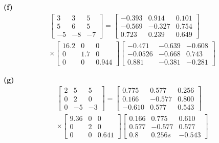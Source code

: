 \begin{resolution}
  \vspace{12pt}
  {\bf (f)}\; \begin{multline*}\begin{bmatrix}
      3 & 3 & 5 \\ 5 & 6 & 5 \\ -5 & -8 & -7
    \end{bmatrix} = \begin{bmatrix}
      -0.393 & 0.914  & 0.101 \\
      -0.569 & -0.327 & 0.754 \\
      0.723  & 0.239  & 0.649
    \end{bmatrix} \\ \times \begin{bmatrix}
      16.2 & 0 & 0 \\ 0 & 1.7 & 0 \\ 0 & 0 & 0.944
    \end{bmatrix}  \begin{bmatrix}
      -0.471 & -0.639 & -0.608 \\ -0.0526 & -0.668 & 0.743 \\ 0.881 & -0.381 & -0.281
    \end{bmatrix}\end{multline*}

  \vspace{12pt}
  {\bf (g)}\; \begin{multline*}\begin{bmatrix}
      2 & 5 & 5 \\ 0 & 2 & 0 \\ 0 & -5 & -3
    \end{bmatrix} = \begin{bmatrix}
      0.775  & 0.577  & 0.256 \\
      0.166  & -0.577 & 0.800 \\
      -0.610 & 0.577  & 0.543
    \end{bmatrix} \\ \times \begin{bmatrix}
      9.36 & 0 & 0 \\ 0 & 2 & 0 \\ 0 & 0 & 0.641
    \end{bmatrix}  \begin{bmatrix}
      0.166 & 0.775 & 0.610 \\ 0.577 & -0.577 & 0.577 \\ 0.8 & 0.256s & -0.543
    \end{bmatrix}\end{multline*}


\end{resolution}

